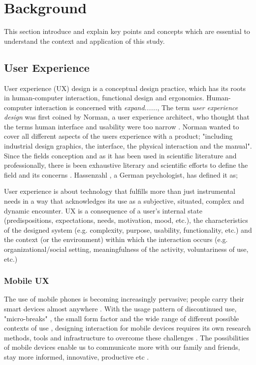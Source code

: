 \chapter{Background}
\label{chap:background}
This section introduce and explain key points and concepts which are essential to understand the context and application of this study.

\section{User Experience}
User experience (UX) design is a conceptual design practice, which has its roots in human-computer interaction, functional design and ergonomics. Human-computer interaction is concerned with \textit{expand......}, The term \textit{user experience design} was first coined by Norman, a user experience architect, who thought that the terms human interface and usability were too narrow \cite{Merholz2008}. Norman wanted to cover all different aspects of the users experience with a product;   "including industrial design graphics, the interface, the physical interaction and the manual". Since the fields conception and as it has been used in scientific literature and professionally, there is been exhaustive literary and scientific efforts to define the field and its concerns \cite{Law2008} \cite{Law2009} \cite{Forlizzi2000}. Hassenzahl \cite{Hassenzahl2006}, a German psychologist, has defined it as;
\begin{displayquote}
  User experience is about technology that fulfills more than just instrumental needs in a way that acknowledges its use as a subjective, situated, complex and dynamic encounter. UX is a consequence of a user's internal state (predispositions, expectations, needs, motivation, mood, etc.), the characteristics of the designed system (e.g. complexity, purpose, usability, functionality, etc.) and the context (or the environment) within which the interaction occurs (e.g. organizational/social setting, meaningfulness of the activity, voluntariness of use, etc.)
\end{displayquote}

\subsection{Mobile UX}
The use of mobile phones is becoming increasingly pervasive; people carry their smart devices almost anywhere \cite{Mallat2004}. With the usage pattern of discontinued use, "micro-breaks" \cite{McGregor2014a}, the small form factor and the wide range of different possible contexts of use \cite{Wang2016}, designing interaction for mobile devices requires its own research methods, tools and infrastructure to overcome these challenges \cite{Nakhimovsky2009}. The possibilities of mobile devices enable us to communicate more with our family and friends, stay more informed, innovative, productive etc \cite{Wang2016}.

